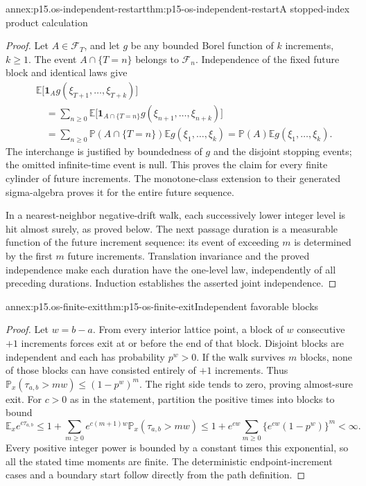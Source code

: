 \begin{annexitem}{annex:p15.os-independent-restart}{thm:p15-os-independent-restart}{A stopped-index product calculation}
\begin{proof}
Let \(A\in\mathcal F_T\), and let \(g\) be any bounded Borel
function of \(k\) increments, \(k\geq1\).
The event \(A\cap\{T=n\}\) belongs to \(\mathcal F_n\).
Independence of the fixed future block and identical laws give
\[
 \begin{split}
 &\mathbb E\bigl[\mathbf1_A
       g(\xi_{T+1},\ldots,\xi_{T+k})\bigr]\\
 &\quad=\sum_{n\geq0}
      \mathbb E\bigl[\mathbf1_{A\cap\{T=n\}}
                    g(\xi_{n+1},\ldots,\xi_{n+k})\bigr]\\
 &\quad=\sum_{n\geq0}\mathbb P(A\cap\{T=n\})
                   \mathbb Eg(\xi_1,\ldots,\xi_k)
 =\mathbb P(A)\mathbb Eg(\xi_1,\ldots,\xi_k).
 \end{split}
 \]
The interchange is justified by boundedness of \(g\) and the
disjoint stopping events; the omitted infinite-time event is null.
This proves the claim for every finite cylinder of future
increments. The monotone-class extension to their generated
sigma-algebra proves it for the entire future sequence.

In a nearest-neighbor negative-drift walk, each successively
lower integer level is hit almost surely, as proved below.
The next passage duration is a measurable function of the
future increment sequence: its event of exceeding \(m\) is
determined by the first \(m\) future increments.
Translation invariance and the proved independence make each
duration have the one-level law, independently of all preceding
durations. Induction establishes the asserted joint independence.
\end{proof}
\end{annexitem}

\begin{annexitem}{annex:p15.os-finite-exit}{thm:p15-os-finite-exit}{Independent favorable blocks}
\begin{proof}
Let \(w=b-a\). From every interior lattice point, a block of
\(w\) consecutive \(+1\) increments forces exit at or before
the end of that block. Disjoint blocks are independent and each
has probability \(p^w>0\).
If the walk survives \(m\) blocks, none of those blocks can have
consisted entirely of \(+1\) increments. Thus
\(\mathbb P_x(\tau_{a,b}>mw)\leq(1-p^w)^m\).
The right side tends to zero, proving almost-sure exit.
For \(c>0\) as in the statement, partition the positive times
into blocks to bound
\[
 \mathbb E_xe^{c\tau_{a,b}}
 \leq 1+\sum_{m\geq0}e^{c(m+1)w}
                       \mathbb P_x(\tau_{a,b}>mw)
 \leq1+e^{cw}\sum_{m\geq0}
                 \{e^{cw}(1-p^w)\}^m<\infty.
 \]
Every positive integer power is bounded by a constant times
this exponential, so all the stated time moments are finite.
The deterministic endpoint-increment cases and a boundary start
follow directly from the path definition.
\end{proof}
\end{annexitem}

